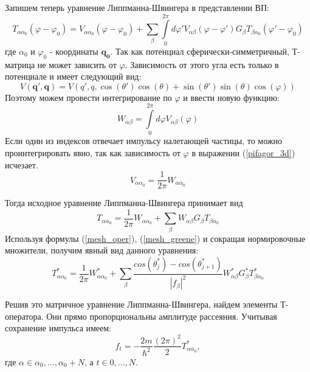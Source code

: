 \documentclass[a4paper,12pt]{article}
\newcommand{\vect}[1]{\boldsymbol{#1}}
\begin{document}
Запишем теперь уравнение Липпманна-Швингера в представлении ВП:
\begin{equation}
 T_{\alpha\alpha_0}(\varphi-\varphi_0) = 
 V_{\alpha\alpha_0}(\varphi-\varphi_0) + 
 \sum\limits_\beta \int\limits_0^{2\pi} d \varphi' V_{\alpha\beta}(\varphi-\varphi') G_{\beta} T_{\beta\alpha_0}(\varphi'-\varphi_0)
\end{equation}
где $\alpha_0$ и $\varphi_0$ - координаты $\vect{q_0}$.  Так как потенциал сферически-симметричный, Т-матрица не может зависить от $\varphi$. Зависимость от этого угла есть только в потенциале и имеет следующий вид:
\begin{equation}
\label{pifagor_3d}
    V(\vect{q'},\vect{q}) = V(q',q, \cos(\theta')\cos(\theta) + \sin(\theta')\sin(\theta)\cos(\varphi) )
\end{equation} 
Поэтому можем провести интегрирование по $\varphi$ и ввести новую функцию:
\begin{equation}
    \label{phi_int}
    W_{\alpha\beta} = \int\limits_{0}^{2\pi} d\varphi V_{\alpha\beta}(\varphi)
\end{equation}
Если один из индексов отвечает импульсу налетающей частицы, то можно проинтегрировать явно, так как зависимость от $\varphi$ в выражении (\ref{pifagor_3d}) исчезает.
\begin{equation}
    V_{\alpha\alpha_0} = \frac{1}{2\pi}W_{\alpha\alpha_0}
\end{equation}

Тогда исходное уравнение Липпманна-Швингера принимает вид
\begin{equation}
    T_{\alpha\alpha_0} = \frac{1}{2\pi}W_{\alpha\alpha_0} + \sum\limits_\beta  W_{\alpha\beta} G_{\beta} T_{\beta\alpha_0}
\end{equation}
Используя формулы (\ref{mesh_oper}), (\ref{mesh_greene}) и сокращая нормировочные множители, получим явный вид данного уравнения:
\begin{equation}
    T^*_{\alpha\alpha_0} = \frac{1}{2\pi}W^*_{\alpha\alpha_0} +
 \sum\limits_\beta \frac{cos(\theta_j^*)-cos(\theta_{j+1}^*)}{|f_\beta|^2} W^*_{\alpha\beta} G^*_{\beta} T^*_{\beta\alpha_0}
\end{equation}

Решив это матричное уравнение Липпманна-Швингера, найдем элементы Т-оператора. Они прямо пропорциональны амплитуде рассеяния. Учитывая сохранение импульса имеем:
\begin{equation}
    f_t = - \frac{2m}{\hbar^2} \frac{(2\pi)^2}{2} T^*_{\alpha\alpha_0},
\end{equation}
где $\alpha \in {\alpha_0, ... , \alpha_0 + N}$, а $t \in {0, ... ,N} $.
\end{document}
